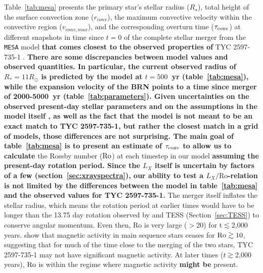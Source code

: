 \documentclass[linenumbers]{aastex631}
\begin{document}
Table~\ref{tab:mesa} presents the primary star's stellar radius ($R_{\star}$), total height of the surface convection zone ($r_{conv}$), the maximum convective velocity within the convective region ($v_{conv,max}$), and the corresponding overturn time ($\tau_{\rm conv}$) at different snapshots in time since $t=0$ of the complete stellar merger from the \texttt{MESA} model \textbf{that comes closest to the observed properties of } TYC 2597-735-1 \citet{2020Natur.587..387H}. \textbf{There are some discrepancies between model values and observed quantities. In particular, the current observed radius of $R_*=11R_{\odot}$ is predicted by the model at $t=500$~yr (table~\ref{tab:mesa}), while the expansion velocity of the BRN points to a time since merger of 2000-5000~yr (table~\ref{tab:parameters}). Given uncertainties on the observed present-day stellar parameters and on the assumptions in the model itself \citep[see supplementary information of][]{2020Natur.587..387H}, as well as the fact that the model is not meant to be an exact match to TYC 2597-735-1, but rather the closest match in a grid of models, those differences are not surprising. The main goal of table~\ref{tab:mesa} is to present an estimate of $\tau_{\rm conv}$ to allow us to calculate }
the Rossby number (${\rm Ro}$) at each timestep in our model \textbf{assuming the present-day rotation period. Since the $L_X$ itself is uncertain by factors of a few (section~\ref{sec:xrayspectra}), our ability to test a $L_X/\mathrm{Ro}$-relation is not limited by the differences between the model in table~\ref{tab:mesa} and the observed values for TYC 2597-735-1.}
The merger itself inflates the stellar radius, which means the rotation period at earlier times would have to be longer than the 13.75 day rotation observed by \citet{2020Natur.587..387H} and TESS (Section~\ref{sec:TESS}) to conserve angular momentum. Even then, Ro is very large ($>$20) for t$\lesssim$2,000 years.  \citet{Pizzolato+2003} show that magnetic activity in main sequence stars ceases for ${\rm Ro} \gtrsim 10$, suggesting that for much of the time close to the merging of the two stars, TYC 2597-735-1 may not have significant magnetic activity.
At later times ($t\gtrsim$2,000 years), ${\rm Ro}$ is within the regime where magnetic activity \textbf{might be} present.
\end{document}
